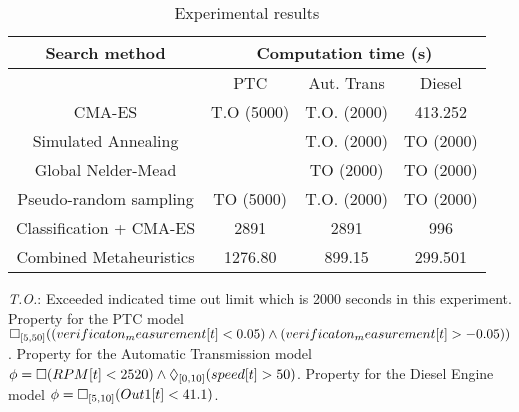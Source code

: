 \begin{table}[ht]
\caption{Experimental results}
\label{tab:results}
\begin{center}
\begin{tabular}{|c|c|c|c||}
\hline
\hline
\multirow{1}{*}{Search method} & \multicolumn{3}{|c|}{Computation time (s)} \\
\hline
\cline{2-4}
 &  PTC & Aut. Trans & Diesel    \\
\hline
\cline{2-4}
 CMA-ES & T.O (5000)  & T.O. (2000)  &  413.252  \\
\hline
\cline{2-4}
 Simulated Annealing &   & T.O. (2000)  & TO (2000)     \\
\hline
\cline{2-4}
Global Nelder-Mead &   &  TO (2000)  &  TO (2000)    \\
\hline
\cline{2-4}
Pseudo-random sampling &  TO (5000)  &  T.O. (2000) & TO (2000)    \\
\hline
\cline{2-4}
Classification + CMA-ES  \cite{CAV2017} & 2891  & 2891  & 996    \\
\hline
\cline{2-4}
 Combined Metaheuristics & 1276.80 &  899.15 & 299.501   \\
\hline
\hline
\end{tabular}
\end{center}
{\small \emph{T.O.}: Exceeded indicated time out limit which is 2000 seconds in this experiment.\\

Property for the PTC model $\Box_{[5,50]}( (verificaton_measurement[t] < 0.05) \land ( verificaton_measurement[t] > - 0.05 ))$. Property for the Automatic Transmission model $\phi =  \Box(RPM[t] < 2520) \land  \Diamond_{[0,10]}(speed[t] > 50)$. Property for the Diesel Engine model   $\phi = \Box_{[5,10]} (Out1[t] < 41.1)$. 
}
\end{table}


